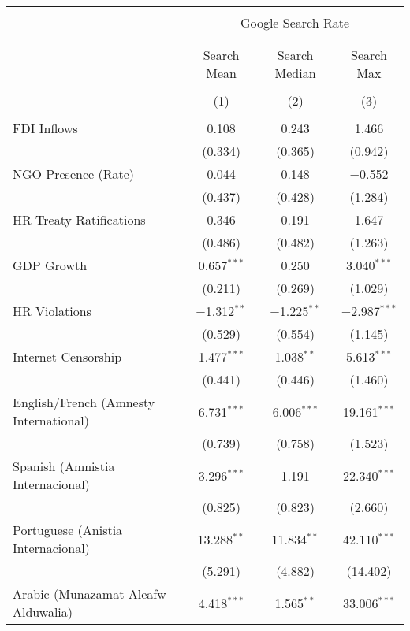 
\begin{table}[!htbp] \centering 
  \caption{} 
  \label{} 
\begin{tabular}{@{\extracolsep{5pt}}lccc} 
\\[-1.8ex]\hline 
\hline \\[-1.8ex] 
 & \multicolumn{3}{c}{Google Search Rate} \\ 
\cline{2-4} 
\\[-1.8ex] & \multicolumn{3}{c}{ } \\ 
 & Search Mean & Search Median & Search Max \\ 
\\[-1.8ex] & (1) & (2) & (3)\\ 
\hline \\[-1.8ex] 
 FDI Inflows & 0.108 & 0.243 & 1.466 \\ 
  & (0.334) & (0.365) & (0.942) \\ 
  NGO Presence (Rate) & 0.044 & 0.148 & $-$0.552 \\ 
  & (0.437) & (0.428) & (1.284) \\ 
  HR Treaty Ratifications & 0.346 & 0.191 & 1.647 \\ 
  & (0.486) & (0.482) & (1.263) \\ 
  GDP Growth & 0.657$^{***}$ & 0.250 & 3.040$^{***}$ \\ 
  & (0.211) & (0.269) & (1.029) \\ 
  HR Violations & $-$1.312$^{**}$ & $-$1.225$^{**}$ & $-$2.987$^{***}$ \\ 
  & (0.529) & (0.554) & (1.145) \\ 
  Internet Censorship & 1.477$^{***}$ & 1.038$^{**}$ & 5.613$^{***}$ \\ 
  & (0.441) & (0.446) & (1.460) \\ 
  English/French (Amnesty International) & 6.731$^{***}$ & 6.006$^{***}$ & 19.161$^{***}$ \\ 
  & (0.739) & (0.758) & (1.523) \\ 
  Spanish (Amnistia Internacional) & 3.296$^{***}$ & 1.191 & 22.340$^{***}$ \\ 
  & (0.825) & (0.823) & (2.660) \\ 
  Portuguese (Anistia Internacional) & 13.288$^{**}$ & 11.834$^{**}$ & 42.110$^{***}$ \\ 
  & (5.291) & (4.882) & (14.402) \\ 
  Arabic (Munazamat Aleafw Alduwalia) & 4.418$^{***}$ & 1.565$^{**}$ & 33.006$^{***}$ \\ 

\end{tabular}
\end{table}

